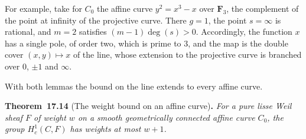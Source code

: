 \documentclass[11pt]{article}
\newenvironment{bpstatement}[2]{\par\addvspace{0.6\baselineskip}\noindent\textbf{#1}#2\textbf{.}\enspace\ignorespaces}
  {\par\addvspace{0.4\baselineskip}}
\newenvironment{bpstatementit}[2]{\begin{bpstatement}{#1}{#2}\itshape\ignorespaces}{\end{bpstatement}}
\begin{document}
\label{bp43}%
For example, take for \(C_0\) the affine curve \(y^2=x^3-x\) over \(\mathbf F_3\), the complement of the point at infinity of the projective curve. There \(g=1\), the point \(s=\infty\) is rational, and \(m=2\) satisfies \((m-1)\deg(s)>0\). Accordingly, the function \(x\) has a single pole, of order two, which is prime to \(3\), and the map is the double cover \((x,y)\mapsto x\) of the line, whose extension to the projective curve is branched over \(0\), \(\pm1\) and \(\infty\).

With both lemmas the bound on the line extends to every affine curve.

\label{bp44}%
\begin{bpstatementit}{Theorem~17.14}{ (The weight bound on an affine curve)}
For a pure lisse Weil sheaf \(F\) of weight \(w\) on a smooth geometrically connected affine curve \(C_0\), the group \(H_c^1(C,F)\) has weights at most \(w+1\).
\end{bpstatementit}
\end{document}
